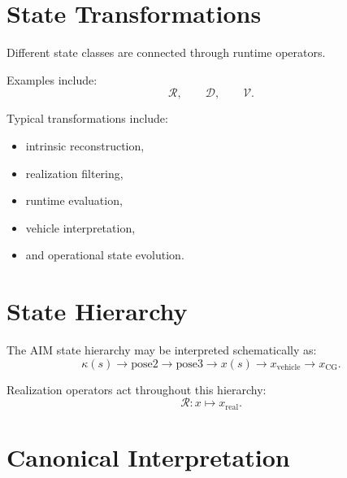 \section{State Transformations}

\begin{remark}
Different state classes are connected through runtime operators.
\end{remark}

\begin{remark}
Examples include:
\[
\mathcal R,
\qquad
\mathcal D,
\qquad
\mathcal V.
\]
\end{remark}

\begin{remark}
Typical transformations include:
\begin{itemize}
\item intrinsic reconstruction,
\item realization filtering,
\item runtime evaluation,
\item vehicle interpretation,
\item and operational state evolution.
\end{itemize}
\end{remark}

\section{State Hierarchy}

\begin{remark}
The AIM state hierarchy may be interpreted schematically as:
\[
\kappa(s)
\rightarrow
\mathrm{pose2}
\rightarrow
\mathrm{pose3}
\rightarrow
x(s)
\rightarrow
x_{\mathrm{vehicle}}
\rightarrow
x_{\mathrm{CG}}.
\]
\end{remark}

\begin{remark}
Realization operators act throughout this hierarchy:
\[
\mathcal R :
x
\mapsto
x_{\mathrm{real}}.
\]
\end{remark}

\section{Canonical Interpretation}

